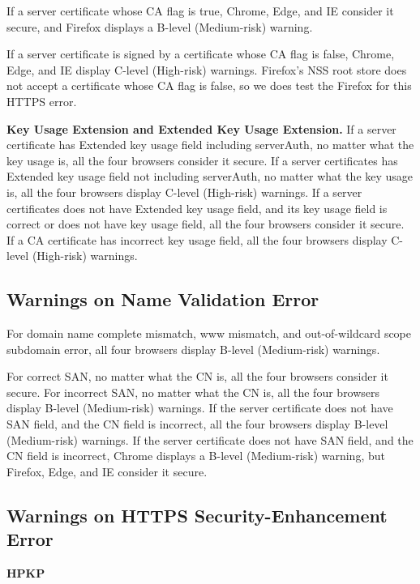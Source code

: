     If a server certificate whose CA flag is true,
    Chrome, Edge, and IE consider it secure,
    and Firefox displays a B-level (Medium-risk) warning.

    If a server certificate is signed by a certificate whose CA flag is false,
     Chrome, Edge, and IE display C-level (High-risk) warnings.
     Firefox's NSS root store does not accept a certificate whose CA flag is false, so we does test the Firefox for this HTTPS error.

\textbf{Key Usage Extension and Extended Key Usage Extension.}
    If a server certificate has Extended key usage field including serverAuth, no matter what the key usage is,
        all the four browsers consider it secure.
    If a server certificates has Extended key usage field not including serverAuth, no matter what the key usage is,
        all the four browsers display C-level (High-risk) warnings.
    If a server certificates does not have Extended key usage field, and its key usage field is correct or does not have key usage field,
        all the four browsers consider it secure.
    If a CA certificate has incorrect key usage field,
        all the four browsers display C-level (High-risk) warnings.

\subsection{Warnings on Name Validation Error}
    For domain name complete mismatch, www mismatch, and out-of-wildcard scope subdomain error,
    all four browsers display B-level (Medium-risk) warnings.

    For correct SAN, no matter what the CN is, all the four browsers consider it secure.
    For incorrect SAN, no matter what the CN is, all the four browsers display B-level (Medium-risk) warnings.
    If the server certificate does not have SAN field, and the CN field is incorrect, all the four browsers display B-level (Medium-risk) warnings.
    If the server certificate does not have SAN field, and the CN field is incorrect,
    Chrome displays a B-level (Medium-risk) warning,
            but Firefox, Edge, and IE consider it secure.

\subsection{Warnings on HTTPS Security-Enhancement Error}
\textbf{HPKP}

